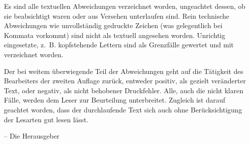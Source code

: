 Es sind alle textuellen Abweichungen verzeichnet worden, ungeachtet dessen, ob sie beabsichtigt waren oder aus Versehen unterlaufen sind. Rein technische Abweichungen wie unvollständig gedruckte Zeichen (was gelegentlich bei Kommata vorkommt) sind nicht als textuell angesehen worden. Unrichtig eingesetzte, z.~B. kopf­stehende Lettern sind als Grenzfälle gewertet und mit verzeichnet worden.

Der bei weitem überwiegende Teil der Abweichungen geht auf die Tätigkeit des Bearbeiters der zweiten Auflage zurück, entweder positiv, als gezielt veränderter Text, oder negativ, als nicht behobe­ner Druckfehler. Alle, auch die nicht klaren Fälle, werden dem Leser zur Beurteilung unterbreitet. Zugleich ist darauf geachtet worden, dass der durchlaufende Text sich auch ohne Berücksichtigung der Lesarten gut lesen lässt.

\begin{flushright}
-- Die Herausgeber
\end{flushright}
